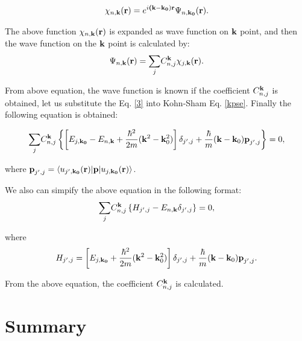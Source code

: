 \documentclass[a4paper, 12pt, titlepage,oneside,drop]{kthesis}
\begin{document}
\begin{equation}\label{2}
\chikp<n><\textbf k> = \expg<(\bold k-\bold {k_0})>  \wfbloch<n><\bold {k_0}>.
\end{equation}

The above function $\chikp<n><\textbf k> $ is expanded as wave function on ${ \textbf k}$ point, and then the wave function on the ${\textbf k}$ point is calculated by:
\begin{equation}\label{3}
\wfbloch<n><\bold k> =  {\sum\limits_{j}} C_{n,j}^{\bold k} \chikp<j><\bold k>. 
\end{equation}

From above equation, the wave function is known if the coefficient $C_{n,j}^{\bold k}$ is obtained, let us substitute the Eq. \ref{3} into Kohn-Sham Eq. \ref{kpse}.
Finally the following equation is obtained:

\begin{equation}\label{5}
{\sum\limits_{j}}  C_{n,j}^{\bold k} \left \{  \left [  \ebloch<j><\bold {k_0}> -  \ebloch<n><\bold k>  + \frac{{\hbar}^2}{2m} { (\bold {k}^2- \bold {k}_0^2)}    \right ] \delta_{j',j} + \frac{\hbar}{m} {(\bold {k}-\bold{k}_0)} {\textbf p_{j',j}} \right \} = 0,
\end{equation}

where ${\textbf p_{j',j}} = \langle \ubloch<j'><\bold {k_0}>| {\textbf p} | \ubloch<j><\bold {k_0}>  \rangle $.
 
We also can simpify the above equation in the following format:
\begin{equation}\label{6}
{\sum\limits_{j}} C_{n,j}^{\bold {k}} \left \{ H_{j',j}- \ebloch<n><\bold {k}> \delta_{j',j} \right \} =0,
\end{equation}

where
\begin{equation} \label{7}
H_{j',j} = \left [  \ebloch<j><\bold {k_0}>  + \frac{{\hbar}^2}{2m} { (\bold{k}^2-\bold{k}_0^2)}    \right ] \delta_{j',j} + \frac{\hbar}{m} {(\bold{k}-\bold{k}_0)} {\textbf p_{j',j}}.
\end{equation}

From the above equation, the coefficient $ C_{n,j}^{\bold k}$ is calculated.





\chapter{Summary}
\end{document}
